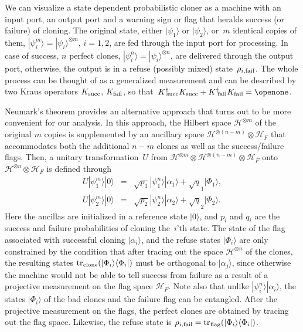 \documentclass[aps,prl,twocolumn,showpacs]{revtex4}
\newcommand{\tr}{{\rm tr}\,}
\newcommand{\ke}[1]{|#1\rangle}
\begin{document}
We can visualize a state dependent probabilistic cloner as a machine with an input port, an output port and a warning sign or flag that heralds success (or failure) of cloning.  The original state, either $|\psi_1\rangle$ or $|\psi_2\rangle$, or~$m$ identical copies of them, $|\psi_i^m\rangle=|\psi_i\rangle^{\otimes m}$, $i=1,2$,  are fed through the input port for processing. In case of success, $n$ perfect clones, $|\psi_i^n\rangle=|\psi_i\rangle^{\otimes n}$,  are delivered through the output port, otherwise, the output is in a refuse (possibly mixed) state~$\rho_{i,{\rm fail}}$. The whole process can be thought of as a generalized measurement and can be described by two Kraus operators $K_{\rm succ}$, $K_{\rm fail}$, so that~$K^\dagger{}_{\kern-.3em\rm succ}K_{\rm succ}+K^\dagger{}_{\kern-.2em\rm fail}K_{\rm fail}=\openone$. 

Neumark's theorem provides an alternative approach  that turns out to be more convenient for our analysis. In this approach, the Hilbert space ${\mathscr H}^{\otimes m}$ of the original $m$ copies is supplemented by an ancillary space ${\mathscr H}^{\otimes(n-m)}\otimes {\mathscr H}_F$ that accommodates both the additional $n-m$ clones as well as the success/failure flags. Then, a unitary transformation~$U$ from ${\mathscr H}^{\otimes m}\otimes {\mathscr H}^{\otimes(n-m)}\otimes {\mathscr H}_{F}$ onto ${\mathscr H}^{\otimes n}\otimes{\mathscr H}_F$ is defined through
%
%
%
\begin{eqnarray}
U|\psi^m_1\rangle|0\rangle&=& \sqrt{p_1}|\psi^n_1\rangle|\alpha_1\rangle +\sqrt q_1 |\Phi_1\rangle,\\
U|\psi^m_2\rangle|0\rangle&=& \sqrt{p_2}|\psi^n_2\rangle|\alpha_2\rangle +\sqrt q_2 |\Phi_2\rangle.
\end{eqnarray}
%
Here the ancillas are initialized in a reference state $\ke 0$, and $p_i$ and $q_i$ are the success and failure probabilities  of cloning the~$i$'th state.  The state of the flag associated with successful cloning $\ke {\alpha_i}$, and the refuse  states $\ke {\Phi_i}$ are only constrained by the condition that after tracing out the space ${\mathscr H}^{\otimes n}$ of the clones, the resulting states $\tr_{\!\rm clone}(|\Phi_i\rangle\langle\Phi_i|)$ must be orthogonal to $|\alpha_j\rangle$, since otherwise the machine would not be able to tell success from failure as a result of a projective measurement on the flag space ${\mathscr H}_F$. Note also that unlike $|\psi^n_i\rangle|\alpha_i\rangle$, the states $|\Phi_i\rangle$ of the bad clones and the failure flag can be entangled. %
After the projective measurement on the flags, the perfect clones are obtained by tracing out the flag space. Likewise, the refuse state is $\rho_{i,{\rm fail}}=\tr_{\!\rm flag}(|\Phi_i\rangle\langle\Phi_i|)$.
\end{document}

